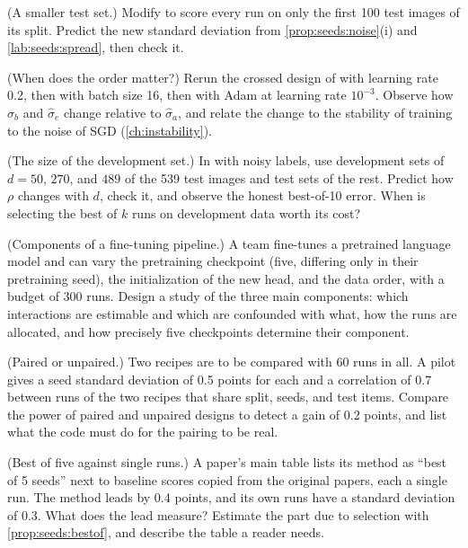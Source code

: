 \begin{refsection}
\begin{exercises}
\item \labwork (A smaller test set.) Modify  to score every run on only the first 100 test images of its split. Predict the new standard deviation from \cref{prop:seeds:noise}(i) and \cref{lab:seeds:spread}, then check it.\label{ex:seeds:smalltest}

\item \labwork (When does the order matter?) Rerun the crossed design of  with learning rate 0.2, then with batch size 16, then with Adam at learning rate $10^{-3}$. Observe how $\hat\sigma_b$ and $\hat\sigma_e$ change relative to $\hat\sigma_a$, and relate the change to the stability of training to the noise of SGD (\cref{ch:instability}).\label{ex:seeds:order}

\item \labwork (The size of the development set.) In  with noisy labels, use development sets of $d=50$, $270$, and $489$ of the 539 test images and test sets of the rest. Predict how $\rho$ changes with $d$, check it, and observe the honest best-of-10 error. When is selecting the best of $k$ runs on development data worth its cost?\label{ex:seeds:devsize}

\item \design (Components of a fine-tuning pipeline.) A team fine-tunes a pretrained language model and can vary the pretraining checkpoint (five, differing only in their pretraining seed), the initialization of the new head, and the data order, with a budget of 300 runs. Design a study of the three main components: which interactions are estimable and which are confounded with what, how the runs are allocated, and how precisely five checkpoints determine their component.\label{ex:seeds:design}

\item \design (Paired or unpaired.) Two recipes are to be compared with 60 runs in all. A pilot gives a seed standard deviation of 0.5 points for each and a correlation of 0.7 between runs of the two recipes that share split, seeds, and test items. Compare the power of paired and unpaired designs to detect a gain of 0.2 points, and list what the code must do for the pairing to be real.\label{ex:seeds:pair}

\item \critique (Best of five against single runs.) A paper's main table lists its method as ``best of 5 seeds'' next to baseline scores copied from the original papers, each a single run. The method leads by 0.4 points, and its own runs have a standard deviation of 0.3. What does the lead measure? Estimate the part due to selection with \cref{prop:seeds:bestof}, and describe the table a reader needs.\label{ex:seeds:critique1}


\end{exercises}
\end{refsection}

